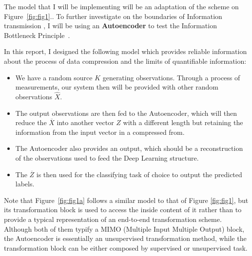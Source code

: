 The model that I will be implementing will be an adaptation of the scheme on Figure~\ref{fig:fig1}.. To further investigate on the boundaries of Information transmission , I will be using an \textbf{Autoencoder} to test the Information Bottleneck Principle~\cite{Inf_Bottleneck_first}.


In this report, I designed the following model which provides reliable information about the process of data compression and the limits of quantifiable information:

\begin{itemize}
\item  We have a random source $K$ generating observations. Through a process of measurements, our system then will be provided with other random observations $\hat{X}$. 

\item The output observations  are then fed to the Autoencoder, which will then reduce the $\overline X$ into another vector $Z$ with a different length but retaining the information from the input vector in a compressed from. 

\item The Autoencoder also provides  an output, which should be a reconstruction of the observations used to feed the Deep Learning structure. 

\item The $\overline Z$ is then used for the classifying task of choice to output the predicted labels. 

\end{itemize}

Note that Figure~\ref{fig:fig1a} follows a similar model to that of Figure \ref{fig:fig1}, but its transformation block is used to access the inside content of it rather than to provide a typical representation of an end-to-end transformation scheme. Although both of them typify a MIMO (Multiple Input Multiple Output) block, the Autoencoder is essentially an unsupervised transformation method, while the transformation block can be either composed by supervised or unsupervised task.\par


